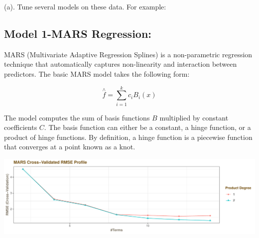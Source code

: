 \documentclass[]{report}
\newenvironment{Shaded}{\begin{snugshade}}{\end{snugshade}}
\newcommand{\KeywordTok}[1]{\textcolor[rgb]{0.13,0.29,0.53}{\textbf{#1}}}
\newcommand{\DataTypeTok}[1]{\textcolor[rgb]{0.13,0.29,0.53}{#1}}
\newcommand{\DecValTok}[1]{\textcolor[rgb]{0.00,0.00,0.81}{#1}}
\newcommand{\StringTok}[1]{\textcolor[rgb]{0.31,0.60,0.02}{#1}}
\newcommand{\OperatorTok}[1]{\textcolor[rgb]{0.81,0.36,0.00}{\textbf{#1}}}
\newcommand{\NormalTok}[1]{#1}
\begin{document}
\begin{subquestion}{(a).} Tune several models on these data. For example: 
\end{subquestion}

\begin{Shaded}
\end{Shaded}

\subsection{Model 1-MARS Regression:}\label{model-1-mars-regression}

MARS (Multivariate Adaptive Regression Splines) is a non-parametric
regression technique that automatically captures non-linearity and
interaction between predictors. The basic MARS model takes the following
form:

\[
\overset { \wedge  }{ f } =\sum _{ i=1 }^{ k }{ { c }_{ i }{ B }_{ i }(x) } 
\]

The model computes the sum of basis functions \(B\) multiplied by
constant coefficients \(C\). The basis function can either be a
constant, a hinge function, or a product of hinge functions. By
definition, a hinge function is a piecewise function that converges at a
point known as a knot.

\includegraphics{AppliedPredictiveModeling_treebased_regression_files/figure-latex/kj-7.2-1-1.pdf}
\end{document}
